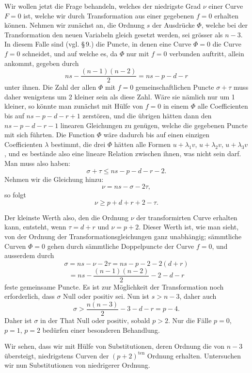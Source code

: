 \documentclass[10pt]{article}
\begin{document}
Wir wollen jetzt die Frage behandeln, welches der niedrigste Grad \(\nu\) einer Curve \(F=0\) ist, welche wir durch Transformation aus einer gegebenen \(f=0\) erhalten können. Nehmen wir zunächst an, die Ordnung \(s\) der Ausdrücke \(\Phi\), welche bei der Transformation den neuen Variabeln gleich gesetzt werden, sei grösser als \(n-3\). In diesem Falle sind (vgl. \S\,9.) die Puncte, in denen eine Curve \(\Phi=0\) die Curve \(f=0\) schneidet, und auf welche es, da \(\Phi\) nur mit \(f=0\) verbunden auftritt, allein ankommt, gegeben durch
\[
ns-\frac{(n-1)(n-2)}{2}=ns-p-d-r
\]
unter ihnen. Die Zahl der allen \(\Phi\) mit \(f=0\) gemeinschaftlichen Puncte \(\sigma+\tau\) muss daher wenigstens um 2 kleiner sein als diese Zahl. Wäre sie nämlich nur um 1 kleiner, so könnte man zunächst mit Hülfe von \(f=0\) in einem \(\Phi\) alle Coefficienten bis auf \(ns-p-d-r+1\) zerstören, und die übrigen hätten dann den \(ns-p-d-r-1\) linearen Gleichungen zu genügen, welche die gegebenen Puncte mit sich führten. Die Function \(\Phi\) wäre dadurch bis auf einen einzigen Coefficienten \(\lambda\) bestimmt, die drei \(\Phi\) hätten alle Formen \(u+\lambda_1v\), \(u+\lambda_2v\), \(u+\lambda_3v\), und es bestände also eine lineare Relation zwischen ihnen, was nicht sein darf. Man muss also haben:
\[
\sigma+\tau\le ns-p-d-r-2.
\]
Nehmen wir die Gleichung hinzu:
\[
\nu=ns-\sigma-2\tau,
\]
so folgt
\[
\nu\ge p+d+r+2-\tau.
\]

Der kleinste Werth also, den die Ordnung \(\nu\) der transformirten Curve erhalten kann, entsteht, wenn \(\tau=d+r\) und \(\nu=p+2\). Dieser Werth ist, wie man sieht, von der Ordnung der Transformationsgleichungen ganz unabhängig; sämmtliche Curven \(\Phi=0\) gehen durch sämmtliche Doppelpuncte der Curve \(f=0\), und ausserdem durch
\[
\sigma=ns-\nu-2\tau=ns-p-2-2(d+r)
\]
\[
=ns-\frac{(n-1)(n-2)}{2}-2-d-r
\]
feste gemeinsame Puncte. Es ist zur Möglichkeit der Transformation noch erforderlich, dass \(\sigma\) Null oder positiv sei. Nun ist \(s>n-3\), daher auch
\[
\sigma>\frac{n(n-3)}{2}-3-d-r=p-4.
\]
Daher ist \(\sigma\) in der That Null oder positiv, sobald \(p>2\). Nur die Fälle \(p=0\), \(p=1\), \(p=2\) bedürfen einer besonderen Behandlung.

Wir sehen, dass wir mit Hülfe von Substitutionen, deren Ordnung die von \(n-3\) übersteigt, niedrigstens Curven der \((p+2)^{\text{ten}}\) Ordnung erhalten. Untersuchen wir nun Substitutionen von niedrigerer Ordnung.
\end{document}
